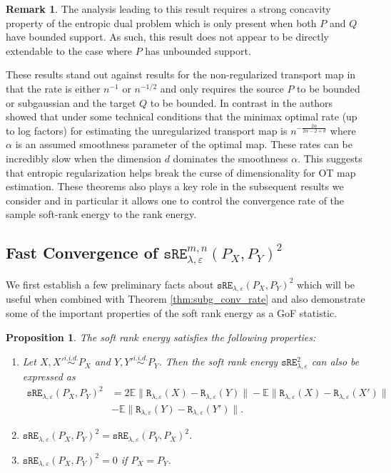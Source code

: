 \documentclass{article}
\newtheorem{proposition}{Proposition}
\theoremstyle{definition}
\newcommand{\sR}{\mathtt{R}_{\lambda,\varepsilon}}
\newcommand{\sRE}{\mathtt{sRE}_{\lambda,\varepsilon}}
\newcommand{\sREn}{\mathtt{sRE}_{\lambda, \varepsilon}^{m,n}}
\newtheorem*{remark}{Remark}
\begin{document}
\begin{remark} 
The analysis leading to this result requires a strong concavity property of the entropic dual problem which is only present when both $P$ and $Q$ have bounded support. As such, this result does not appear to be directly extendable to the case where $P$ has unbounded support.
\end{remark}

These results stand out against results for the non-regularized transport map in that the rate is either $n^{-1}$ or $n^{-1/2}$ and only requires the source $P$ to be bounded or subgaussian and the target $Q$ to be bounded. In contrast in \cite{Hutter2021_Minimax} the authors showed that under some technical conditions that the minimax optimal rate (up to log factors) for estimating the unregularized transport map is $n^{-\frac{2\alpha}{2\alpha - 2 + d}}$ where $\alpha$ is an assumed smoothness parameter of the optimal map. These rates can be incredibly slow when the dimension $d$ dominates the smoothness $\alpha$.  This suggests that entropic regularization helps break the curse of dimensionality for OT map estimation.  These theorems also plays a key role in the subsequent results we consider and in particular it allows one to control the convergence rate of the sample soft-rank energy to the rank energy.

\subsection{Fast Convergence of \texorpdfstring{$\sREn(P_X, P_Y)^2$}{sRE}}

We first establish a few preliminary facts about $\sRE(P_X,P_Y)^2$ which will be useful when combined with Theorem \ref{thm:subg_conv_rate} and also demonstrate some of the important properties of the soft rank energy as a GoF statistic.

\begin{proposition}\label{prop:properties} 
The soft rank energy satisfies the following properties:
\begin{enumerate}
    \item[(a)] Let $X, X'\overset{i.i.d.}{\sim} P_X$ and $Y, Y' \overset{i.i.d.}{\sim} P_Y$. Then the soft rank energy $\sRE^2$ can also be expressed as 
    \begin{align*}
        \sRE(P_X,P_Y)^2 &= 2\mathbb E\big\|\sR(X)-\sR(Y)\big\|- \mathbb E\big\|\sR(X)-\sR(X')\big\| \nonumber \\ 
        & - \mathbb E\big\|\sR(Y)-\sR(Y')\big\|.
    \end{align*}
    \item[(b)] $\sRE(P_X,P_Y)^2 =\sRE(P_Y,P_X)^2$.
    \item[(c)] $\sRE(P_X,P_Y)^2 = 0$ if $P_X = P_Y$.
\end{enumerate}
\end{proposition}
\end{document}

